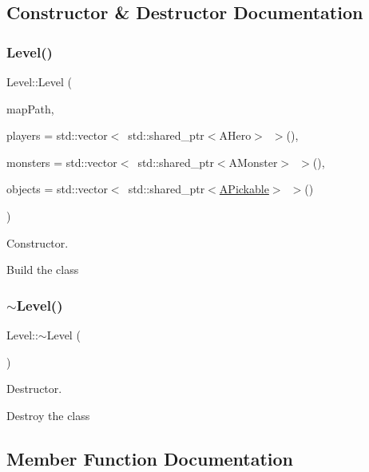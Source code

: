 \subsection{Constructor \& Destructor Documentation}
\mbox{\label{classLevel_a1cddef79da66a80002686199a847543f}} 
\subsubsection{\texorpdfstring{Level()}{Level()}}
{\footnotesize\ttfamily Level\+::\+Level (\begin{DoxyParamCaption}\item[{const W\+String \&}]{map\+Path,  }\item[{std\+::vector$<$ std\+::shared\+\_\+ptr$<$ A\+Hero $>$ $>$}]{players = {\ttfamily std\+:\+:vector$<$~std\+:\+:shared\+\_\+ptr$<$AHero$>$~$>$()},  }\item[{std\+::vector$<$ std\+::shared\+\_\+ptr$<$ A\+Monster $>$ $>$}]{monsters = {\ttfamily std\+:\+:vector$<$~std\+:\+:shared\+\_\+ptr$<$AMonster$>$~$>$()},  }\item[{std\+::vector$<$ std\+::shared\+\_\+ptr$<$ \hyperlink{classAPickable}{A\+Pickable} $>$ $>$}]{objects = {\ttfamily std\+:\+:vector$<$~std\+:\+:shared\+\_\+ptr$<$\hyperlink{classAPickable}{A\+Pickable}$>$~$>$()} }\end{DoxyParamCaption})}



Constructor. 

Build the class \mbox{\label{classLevel_a249eac1e8f19ff44134efa5e986feaca}} 
\subsubsection{\texorpdfstring{$\sim$\+Level()}{~Level()}}
{\footnotesize\ttfamily Level\+::$\sim$\+Level (\begin{DoxyParamCaption}{ }\end{DoxyParamCaption})}



Destructor. 

Destroy the class 

\subsection{Member Function Documentation}
\mbox{\label{classLevel_aa88db36cd824320cb599d913603dc2a3}} 
